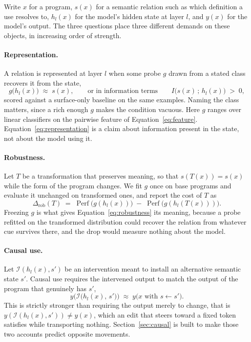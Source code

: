 \documentclass{article}
\begin{document}
Write $x$ for a program, $s(x)$ for a semantic relation such as which definition a use resolves to, $h_l(x)$ for the model's hidden state at layer $l$, and $y(x)$ for the model's output. The three questions place three different demands on these objects, in increasing order of strength.

\paragraph{Representation.}
A relation is represented at layer $l$ when some probe $g$ drawn from a stated class recovers it from the state,
%
\begin{equation}
  g\big(h_l(x)\big) \;\approx\; s(x),
  \qquad\text{or in information terms}\qquad
  I\big(s(x)\,;\,h_l(x)\big) \;>\; 0 ,
  \label{eq:representation}
\end{equation}
%
scored against a surface-only baseline on the same examples. Naming the class matters, since a rich enough $g$ makes the condition vacuous. Here $g$ ranges over linear classifiers on the pairwise feature of Equation~\ref{eq:feature}. Equation~\ref{eq:representation} is a claim about information present in the state, not about the model using it.

\paragraph{Robustness.}
Let $T$ be a transformation that preserves meaning, so that $s(T(x)) = s(x)$ while the form of the program changes. We fit $g$ once on base programs and evaluate it unchanged on transformed ones, and report the cost of $T$ as
%
\begin{equation}
  \Delta_{\mathrm{rob}}(T)
  \;=\;
  \operatorname{Perf}\!\big(g(h_l(x))\big)
  \;-\;
  \operatorname{Perf}\!\big(g(h_l(T(x)))\big).
  \label{eq:robustness}
\end{equation}
%
Freezing $g$ is what gives Equation~\ref{eq:robustness} its meaning, because a probe refitted on the transformed distribution could recover the relation from whatever cue survives there, and the drop would measure nothing about the model.

\paragraph{Causal use.}
Let $\mathcal{I}(h_l(x), s')$ be an intervention meant to install an alternative semantic state $s'$. Causal use requires the intervened output to match the output of the program that genuinely has $s'$,
%
\begin{equation}
  y\Big(\mathcal{I}\big(h_l(x),\, s'\big)\Big)
  \;\approx\;
  y\big(x \text{ with } s \leftarrow s'\big).
  \label{eq:causal-use}
\end{equation}
%
This is strictly stronger than requiring the output merely to change, that is $y(\mathcal{I}(h_l(x),s')) \neq y(x)$, which an edit that steers toward a fixed token satisfies while transporting nothing. Section~\ref{sec:causal} is built to make those two accounts predict opposite movements.
\end{document}
